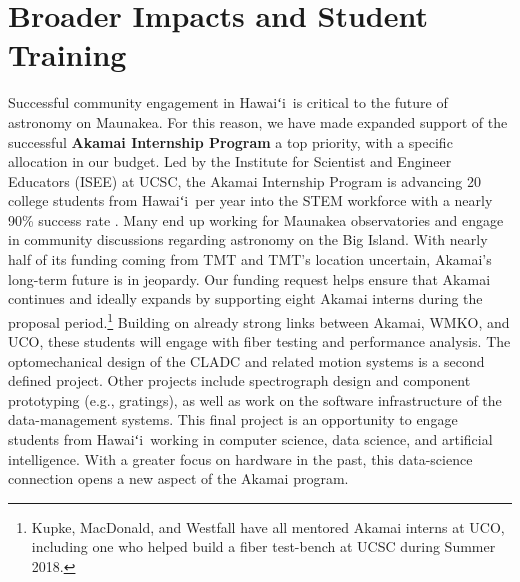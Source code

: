 \documentclass[oneside,11pt]{amsart}
\newcommand{\hawaii}{Hawaiʻi}
\begin{document}


\section{Broader Impacts and Student Training}
\label{sec:bi}

Successful community engagement in \hawaii\ is critical to the future of astronomy on Maunakea.  For this reason, we have made expanded support of the successful \textbf{Akamai Internship Program} a top priority, with a specific allocation in our budget. Led by the Institute for Scientist and Engineer Educators (ISEE) at UCSC, the Akamai Internship Program is advancing 20 college students from \hawaii\ per year into the STEM workforce with a nearly 90\% success rate \citep{asee_peer_31030}.  Many end up working for Maunakea observatories and engage in community discussions regarding astronomy on the Big Island.  With nearly half of its funding coming from TMT and TMT's location uncertain, Akamai's long-term future is in jeopardy.  Our funding request helps ensure that Akamai continues and ideally expands by supporting eight Akamai interns during the proposal period.\footnote{Kupke, MacDonald, and Westfall have all mentored Akamai interns at UCO, including one who helped build a fiber test-bench at UCSC during Summer 2018.} Building on already strong links between Akamai, WMKO, and UCO, these students will engage with fiber testing and performance analysis. The optomechanical design of the CLADC and related motion systems is a second defined project.  Other projects include spectrograph design and component prototyping (e.g., gratings), as well as work on the software infrastructure of the data-management systems.  This final project is an opportunity to engage students from \hawaii\ working in computer science, data science, and artificial intelligence.  With a greater focus on hardware in the past, this data-science connection opens a new aspect of the Akamai program. 
\end{document}
